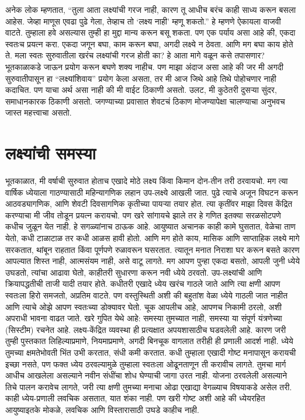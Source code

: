 अनेक लोक म्हणतात, ``तुला आता लक्ष्यांची गरज नाही, कारण तू आधीच बरंच काही साध्य करून बसला आहेस. जेव्हा माणूस एवढा पुढे गेला, तेव्हाच तो `लक्ष्य नाही' म्हणू शकतो.'' हे म्हणणे ऐकायला वाजवी वाटते. तुम्हाला हवे असल्यास तुम्ही हा मुद्दा मान्य करून बसू शकता. पण एक पर्याय असा आहे की,  एकदा स्वतःच प्रयत्न करा. एकदा जगून बघा, काम करून बघा, अगदी लक्ष्ये न ठेवता. आणि मग बघा काय होते ते.
मला स्वतः सुरुवातीला खरंच लक्ष्यांची गरज होती का? हे आता मागे वळून कसे तपासणार? भूतकाळाकडे जाऊन प्रयोग करून बघणे शक्य नाहीच. पण माझा अंदाज असा आहे की जर मी अगदी सुरुवातीपासून हा ``लक्ष्यांशिवाय'' प्रयोग केला असता, तर मी आज जिथे आहे तिथे पोहोचणार नाही कदाचित. पण याचा अर्थ असा नाही की मी वाईट ठिकाणी असतो. उलट, मी कुठेतरी दुसर्‍या सुंदर, समाधानकारक ठिकाणी असतो. जगण्याच्या प्रवासात शेवटचं ठिकाण मोजण्यापेक्षा चालण्याचा अनुभवच जास्त महत्त्वाचा असतो.


\section*{लक्ष्यांची समस्या}
भूतकाळात, मी वर्षाची सुरुवात होताच एखादे मोठे लक्ष्य किंवा किमान दोन-तीन तरी ठरवायचो. मग त्या वार्षिक ध्येयाला गाठण्यासाठी महिन्यागणिक लहान उप-लक्ष्ये आखली जात. पुढे त्याचे अजून विघटन करून आठवड्यागणिक, आणि शेवटी दिवसागणिक कृतीच्या पायऱ्या तयार होत. त्या कृतींवर माझा दिवस केंद्रित करण्याचा मी जीव तोडून प्रयत्न करायचो.
पण खरे सांगायचे झाले तर हे गणित इतक्या सरळसोटपणे कधीच जुळून येत नाही. हे सगळ्यांनाच ठाऊक आहे. आयुष्यात अचानक काही कामे घुसतात, वेळेचा ताण येतो, कधी टाळाटाळ तर कधी आळस हावी होतो. आणि मग होते काय, मासिक आणि साप्ताहिक लक्ष्ये मागे सरकतात, थांबून राहतात किंवा पूर्णपणे रुळावरून घसरतात. त्यातून मनात निराशा घर करून बसते कारण आपल्यात शिस्त नाही, आत्मसंयम नाही, असे वाटू लागते. मग आपण पुन्हा एकदा बसतो, आपली जुनी ध्येये उघडतो, त्यांचा आढावा घेतो, काहीतरी सुधारणा करून नवी ध्येये ठरवतो. उप-लक्ष्यांची आणि क्रियापद्धतीची ताजी यादी तयार होते.
कधीतरी एखादे ध्येय खरंच गाठले जाते आणि त्या क्षणी आपण स्वतःला हिरो समजतो, अप्रतिम वाटते. पण वस्तुस्थिती अशी की बहुतांश वेळा ध्येये गाठली जात नाहीत आणि त्याचे ओझे आपण स्वतःच्या डोक्यावर घेतो. चूक आपलीच आहे, आपणच निकामी ठरलो, अशी अपराधी भावना वाढत जाते.
खरे गुपित येथे आहे: समस्या तुमच्यात नाही, समस्या या संपूर्ण यंत्रणेच्या (सिस्टीम) रचनेत आहे. लक्ष्य-केंद्रित व्यवस्था ही प्रत्यक्षात अपयशासाठीच घडवलेली आहे.
कारण जरी तुम्ही पुस्तकात लिहिल्याप्रमाणे, नियमाप्रमाणे, अगदी बिनचूक वागलात तरीही ही प्रणाली आदर्श नाही. ध्येये तुमच्या क्षमतेभोवती भिंत उभी करतात, संधी कमी करतात. कधी तुम्हाला एखादी गोष्ट मनापासून करायची इच्छा नसते, पण फक्त ध्येय ठरवल्यामुळे तुम्हाला स्वतःला ओढूनताणून ती करावीच लागते. तुमचा मार्ग आधीच आखलेला असल्याने नवीन संधींचा शोध घेण्याची जागा उरत नाही. योजना ठरवलेली असल्याने तिचे पालन करावेच लागते, जरी त्या क्षणी तुमच्या मनाचा ओढा एखाद्या वेगळ्याच विषयाकडे असेल तरी.
काही ध्येय-प्रणाली लवचिक असतात, यात शंका नाही. पण खरी गोष्ट अशी आहे की ध्येयरहित आयुष्याइतके मोकळे, लवचिक आणि विस्तारासाठी उघडे काहीच नाही.
